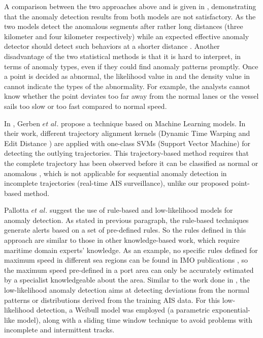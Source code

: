 \documentclass[12pt,glossary]{dalcsthesis}
\begin{document}
A comparison between the two approaches above \cite{gmm} and \cite{kde} is given in \cite{comparison}, demonstrating that the anomaly detection results from both models are not satisfactory. %
As the two models detect the anomalous segments after rather long distances (three kilometer and four kilometer respectively) while an expected effective anomaly detector should detect such behaviors at a shorter distance \cite{comparison}. %
Another disadvantage of the two statistical methods is that it is hard to interpret, in terms of anomaly types, even if they could find anomaly patterns promptly. Once a point is decided as abnormal, the likelihood value in \cite{gmm} and the density value in \cite{kde} cannot indicate the types of the abnormality. For example, the analysts cannot know whether the point deviates too far away from the normal lanes or the vessel sails too slow or too fast compared to normal speed.




In \cite{Gerben}, Gerben $et$ $al.$ propose a technique based on Machine Learning models. In their work, different trajectory alignment kernels (Dynamic Time Warping \cite{dtw} and Edit Distance \cite{edit_distance}) are applied with one-class SVMs (Support Vector Machine) \cite{svm} for detecting the outlying trajectories. This trajectory-based method requires that the complete trajectory has been observed before it can be classified as normal or anomalous \cite{phdthesis}, which is not applicable for sequential anomaly detection in incomplete trajectories (real-time AIS surveillance), unlike our proposed point-based method.



Pallotta $et$ $al.$ \cite{PallottaFramework} suggest the use of rule-based and low-likelihood models for anomaly detection. As stated in previous paragraph, the rule-based techniques generate alerts based on a set of pre-defined rules. So the rules defined in this approach are similar to those in other knowledge-based work, which require maritime domain experts' knowledge. As an example,  no specific rules defined for maximum speed in different sea regions can be found in IMO publications \cite{tss}\cite{anabook}, so the maximum speed pre-defined in a port area can only be accurately estimated by a specialist knowledgeable about the area. Similar to the work done in \cite{gmm}, the low-likelihood anomaly detection aims at detecting deviations from the normal patterns or distributions derived from the training AIS data. For this low-likelihood detection, a Weibull model was employed (a parametric exponential-like model), along with a sliding time window technique to avoid problems with incomplete and intermittent tracks.
\end{document}
